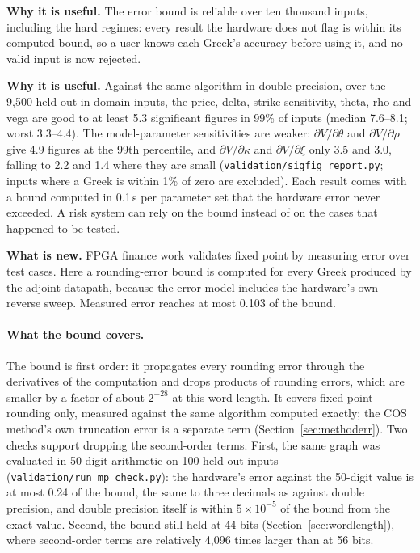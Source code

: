 \documentclass[11pt,a4paper]{article}
\newcommand{\useful}[1]{\par\noindent\textbf{\textcolor{accent}{Why it is useful.}} #1\par}
\newcommand{\novel}[1]{\par\noindent\textbf{\textcolor{accent}{What is new.}} #1\par}
\begin{document}
\useful{The error bound is reliable over ten thousand inputs, including the hard regimes:
every result the hardware does not flag is within its computed bound, so a user knows
each Greek's accuracy before using it, and no valid input is now rejected.}

\useful{Against the same algorithm in double precision, over the 9,500 held-out
in-domain inputs, the price, delta, strike sensitivity, theta, rho and vega are good to
at least 5.3 significant figures in 99\% of inputs (median 7.6--8.1; worst 3.3--4.4).
The model-parameter sensitivities are weaker: $\partial V/\partial\theta$ and
$\partial V/\partial\rho$ give 4.9 figures at the 99th percentile, and
$\partial V/\partial\kappa$ and $\partial V/\partial\xi$ only 3.5 and 3.0, falling to
2.2 and 1.4 where they are small (\texttt{validation/sigfig\_report.py}; inputs where a
Greek is within 1\% of zero are excluded). Each result comes with a bound computed in
0.1\,s per parameter set that the hardware error never exceeded. A risk system can rely on the bound instead of on the cases that
happened to be tested.}
\novel{FPGA finance work validates fixed point by measuring error over test cases.
Here a rounding-error bound is computed for every Greek produced by the adjoint
datapath, because the error model includes the hardware's own reverse sweep.
Measured error reaches at most 0.103 of the bound.}

\paragraph{What the bound covers.} The bound is first order: it propagates every
rounding error through the derivatives of the computation and drops products of
rounding errors, which are smaller by a factor of about $2^{-28}$ at this word length.
It covers fixed-point rounding only, measured against the same algorithm computed
exactly; the COS method's own truncation error is a separate term
(Section~\ref{sec:methoderr}). Two checks support dropping the second-order terms.
First, the same graph was evaluated in 50-digit arithmetic on 100 held-out inputs
(\texttt{validation/run\_mp\_check.py}): the hardware's error against the 50-digit value
is at most 0.24 of the bound, the same to three decimals as against double precision,
and double precision itself is within $5\times10^{-5}$ of the bound from the exact value.
Second, the bound still held at 44 bits (Section~\ref{sec:wordlength}), where
second-order terms are relatively 4,096 times larger than at 56 bits.
\end{document}
